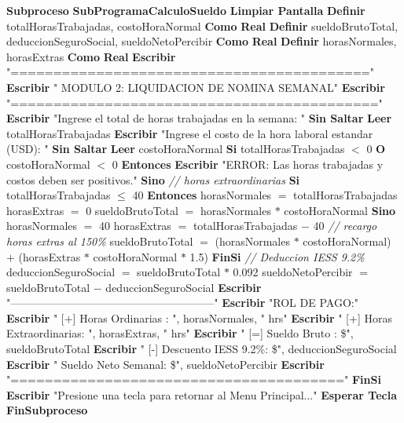 \documentclass[12pt,a4paper]{article}
\newcommand{\kw}[1]{\textcolor{pseKeyword}{\textbf{#1}}}
\newcommand{\txt}[1]{\textcolor{pseString}{"#1"}}
\newcommand{\num}[1]{\textcolor{pseNumber}{#1}}
\newcommand{\cmt}[1]{\textcolor{pseComment}{\textit{// #1}}}
\newcommand{\opAsig}{\textcolor{pseKeyword}{$=$}}
\newcommand{\opMas}{\textcolor{pseKeyword}{$+$}}
\newcommand{\opMenos}{\textcolor{pseKeyword}{$-$}}
\newcommand{\opPor}{\textcolor{pseKeyword}{$*$}}
\newcommand{\opMenor}{\textcolor{pseKeyword}{$<$}}
\newcommand{\opMenorIgual}{\textcolor{pseKeyword}{$\leq$}}
\newcommand{\Asignacion}[2]{#1\; \opAsig\; #2}
\newcommand{\Escribir}[1]{\kw{Escribir} #1}
\newcommand{\EscribirSS}[1]{\kw{Escribir} #1 \kw{Sin Saltar}}
\newcommand{\Leer}[1]{\kw{Leer} #1}
\newcommand{\Definir}[2]{\kw{Definir} #1 \kw{Como} \kw{#2}}
\newcommand{\Si}[1]{\kw{Si} #1 \kw{Entonces}}
\newcommand{\Sino}{\kw{Sino}}
\newcommand{\FinSi}{\kw{FinSi}}
\newcommand{\Subproceso}[1]{\kw{Subproceso} \textbf{#1}}
\newcommand{\FinSubproceso}{\kw{FinSubproceso}}
\newcommand{\I}{\hspace{1.5em}}
\newcommand{\II}{\hspace{3.0em}}
\newcommand{\III}{\hspace{4.5em}}
\begin{document}
\begin{algorithmic}[1]
		\State \Subproceso{SubProgramaCalculoSueldo}
		\State \I \kw{Limpiar Pantalla}
		\State \I \Definir{totalHorasTrabajadas, costoHoraNormal}{Real}
		\State \I \Definir{sueldoBrutoTotal, deduccionSeguroSocial, sueldoNetoPercibir}{Real}
		\State \I \Definir{horasNormales, horasExtras}{Real}
		\State
		\State \I \Escribir{\txt{==========================================}}
		\State \I \Escribir{\txt{    MODULO 2: LIQUIDACION DE NOMINA SEMANAL}}
		\State \I \Escribir{\txt{===========================================}}
		\State \I \EscribirSS{\txt{Ingrese el total de horas trabajadas en la semana: }}
		\State \I \Leer{totalHorasTrabajadas}
		\State \I \EscribirSS{\txt{Ingrese el costo de la hora laboral estandar (USD): }}
		\State \I \Leer{costoHoraNormal}
		\State
		\State \I \Si{totalHorasTrabajadas \opMenor{} \num{0} \kw{ O } costoHoraNormal \opMenor{} \num{0}}
		\State \II \Escribir{\txt{ERROR: Las horas trabajadas y costos deben ser positivos.}}
		\State \I \Sino
		\State \II \cmt{horas extraordinarias}
		\State \II \Si{totalHorasTrabajadas \opMenorIgual{} \num{40}}
		\State \III \Asignacion{horasNormales}{totalHorasTrabajadas}
		\State \III \Asignacion{horasExtras}{\num{0}}
		\State \III \Asignacion{sueldoBrutoTotal}{horasNormales \opPor{} costoHoraNormal}
		\State \II \Sino
		\State \III \Asignacion{horasNormales}{\num{40}}
		\State \III \Asignacion{horasExtras}{totalHorasTrabajadas \opMenos{} \num{40}}
		\State \III \cmt{recargo horas extras al 150\%}
		\State \III \Asignacion{sueldoBrutoTotal}{(horasNormales \opPor{} costoHoraNormal) \opMas{} (horasExtras \opPor{} costoHoraNormal \opPor{} \num{1.5})}
		\State \II \FinSi
		\State
		\State \II \cmt{Deduccion IESS 9.2\%}
		\State \II \Asignacion{deduccionSeguroSocial}{sueldoBrutoTotal \opPor{} \num{0.092}}
		\State \II \Asignacion{sueldoNetoPercibir}{sueldoBrutoTotal \opMenos{} deduccionSeguroSocial}
		\State
		\State \II \Escribir{\txt{--------------------------------------------------------}}
		\State \II \Escribir{\txt{ROL DE PAGO:}}
		\State \II \Escribir{\txt{  [+] Horas Ordinarias   : }, horasNormales, \txt{ hrs}}
		\State \II \Escribir{\txt{  [+] Horas Extraordinarias: }, horasExtras, \txt{ hrs}}
		\State \II \Escribir{\txt{  [=] Sueldo Bruto        : \$}, sueldoBrutoTotal}
		\State \II \Escribir{\txt{  [-] Descuento IESS 9.2\%: \$}, deduccionSeguroSocial}
		\State \II \Escribir{\txt{   Sueldo Neto Semanal: \$}, sueldoNetoPercibir}
		\State \II \Escribir{\txt{=======================================}}
		\State \I \FinSi
		\State \I \Escribir{\txt{Presione una tecla para retornar al Menu Principal...}}
		\State \I \kw{Esperar Tecla}
		\State \FinSubproceso
		

\end{algorithmic}
\end{document}
